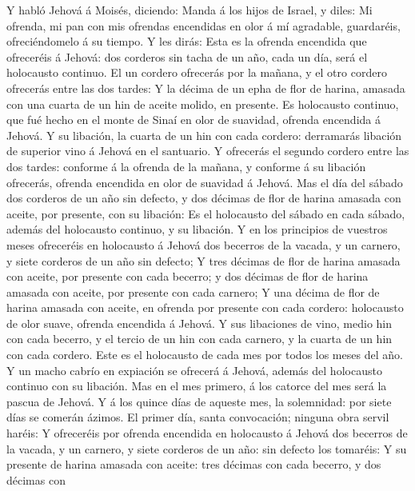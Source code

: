  Y habló Jehová á Moisés, diciendo:  Manda á los
hijos de Israel, y diles: Mi ofrenda, mi pan con mis ofrendas encendidas
en olor á mí agradable, guardaréis, ofreciéndomelo á su tiempo.
 Y les dirás: Esta es la ofrenda encendida que ofreceréis á
Jehová: dos corderos sin tacha de un año, cada un día, será el
holocausto continuo.  El un cordero ofrecerás por la mañana,
y el otro cordero ofrecerás entre las dos tardes:  Y la
décima de un epha de flor de harina, amasada con una cuarta de un hin de
aceite molido, en presente.  Es holocausto continuo, que fué
hecho en el monte de Sinaí en olor de suavidad, ofrenda encendida á
Jehová.  Y su libación, la cuarta de un hin con cada
cordero: derramarás libación de superior vino á Jehová en el santuario.
 Y ofrecerás el segundo cordero entre las dos tardes:
conforme á la ofrenda de la mañana, y conforme á su libación ofrecerás,
ofrenda encendida en olor de suavidad á Jehová.  Mas el día
del sábado dos corderos de un año sin defecto, y dos décimas de flor de
harina amasada con aceite, por presente, con su libación: 
Es el holocausto del sábado en cada sábado, además del holocausto
continuo, y su libación.  Y en los principios de vuestros
meses ofreceréis en holocausto á Jehová dos becerros de la vacada, y un
carnero, y siete corderos de un año sin defecto;  Y tres
décimas de flor de harina amasada con aceite, por presente con cada
becerro; y dos décimas de flor de harina amasada con aceite, por
presente con cada carnero;  Y una décima de flor de harina
amasada con aceite, en ofrenda por presente con cada cordero: holocausto
de olor suave, ofrenda encendida á Jehová.  Y sus
libaciones de vino, medio hin con cada becerro, y el tercio de un hin
con cada carnero, y la cuarta de un hin con cada cordero. Este es el
holocausto de cada mes por todos los meses del año.  Y un
macho cabrío en expiación se ofrecerá á Jehová, además del holocausto
continuo con su libación.  Mas en el mes primero, á los
catorce del mes será la pascua de Jehová.  Y á los quince
días de aqueste mes, la solemnidad: por siete días se comerán ázimos.
 El primer día, santa convocación; ninguna obra servil
haréis:  Y ofreceréis por ofrenda encendida en holocausto á
Jehová dos becerros de la vacada, y un carnero, y siete corderos de un
año: sin defecto los tomaréis:  Y su presente de harina
amasada con aceite: tres décimas con cada becerro, y dos décimas con
